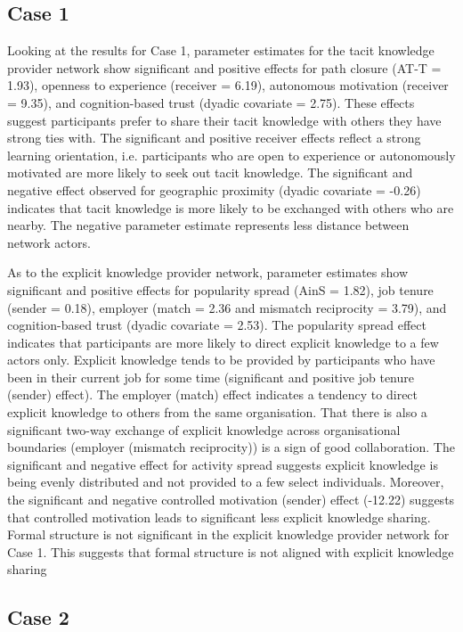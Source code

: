 \subsection{Case 1}

Looking at the results for Case 1, parameter estimates for the tacit knowledge provider network show significant and positive effects for path closure (AT-T = 1.93), openness to experience (receiver = 6.19), autonomous motivation (receiver = 9.35), and cognition-based trust (dyadic covariate = 2.75). These effects suggest participants prefer to share their tacit knowledge with others they have strong ties with. The significant and positive receiver effects reflect a strong learning orientation, i.e. participants who are open to experience or autonomously motivated are more likely to seek out tacit knowledge. The significant and negative effect observed for geographic proximity (dyadic covariate = -0.26) indicates that tacit knowledge is more likely to be exchanged with others who are nearby. The negative parameter estimate represents less distance between network actors. \medskip

As to the explicit knowledge provider network, parameter estimates show significant and positive effects for popularity spread (AinS = 1.82), job tenure (sender = 0.18), employer (match = 2.36 and mismatch reciprocity = 3.79), and cognition-based trust (dyadic covariate = 2.53). The popularity spread effect indicates that participants are more likely to direct explicit knowledge to a few actors only. Explicit knowledge tends to be provided by participants who have been in their current job for some time (significant and positive job tenure (sender) effect). The employer (match) effect indicates a tendency to direct explicit knowledge to others from the same organisation. That there is also a significant two-way exchange of explicit knowledge across organisational boundaries (employer (mismatch reciprocity)) is a sign of good collaboration. The significant and negative effect for activity spread suggests explicit knowledge is being evenly distributed and not provided to a few select individuals. Moreover, the significant and negative controlled motivation (sender) effect (-12.22) suggests that controlled motivation leads to significant less explicit knowledge sharing. Formal structure is not significant in the explicit knowledge provider network for Case 1. This suggests that formal structure is not aligned with explicit knowledge sharing

\subsection{Case 2}

